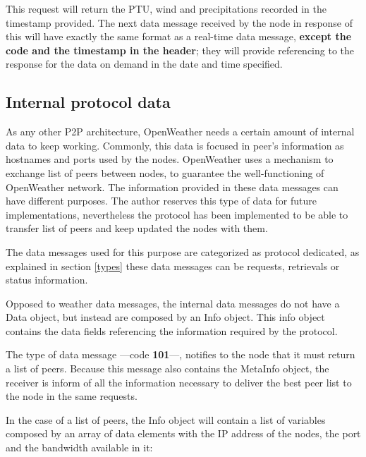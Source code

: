 This request will return the \gls{PTU}, wind and precipitations recorded in the timestamp provided. The next data message received by the node in response of this will have exactly the same format as a real-time data message, \textbf{except the code and the timestamp in the header}; they will provide referencing to the response for the data on demand in the date and time specified.

\subsection{Internal protocol data}

As any other \gls{P2P} architecture, OpenWeather needs a certain amount of internal data to keep working. Commonly, this data is focused in peer's information as hostnames and ports used by the nodes. OpenWeather uses a mechanism to exchange list of peers between nodes, to guarantee the well-functioning of OpenWeather network. The information provided in these data messages can have different purposes. The author reserves this type of data for future implementations, nevertheless the protocol has been implemented to be able to transfer list of peers and keep updated the nodes with them.

The data messages used for this purpose are categorized as protocol dedicated, as explained in section \ref{types} these data messages can be requests, retrievals  or status information.

Opposed to weather data messages, the internal data messages do not have a Data object, but instead are composed by an Info object. This info object contains the data fields referencing the information required by the protocol.

The type of data message —code \textbf{101}—, notifies to the node that it must return a list of peers. Because this message also contains the MetaInfo object, the receiver is inform of all the information necessary to deliver the best peer list to the node in the same requests.

In the case of a list of peers, the Info object will contain a list of variables composed by an array of data elements with the \gls{IP} address of the nodes, the port and the bandwidth available in it:

